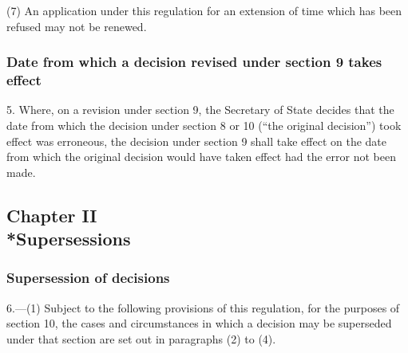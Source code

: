 \documentclass[12pt,a4paper]{article}
\begin{document}
(7) An application under this regulation for an extension of time which has been refused may not be renewed.

\subsubsection[5. Date from which a decision revised under section 9 takes effect]{Date from which a decision revised under section 9 takes effect}

5.  Where, on a revision under section 9, the Secretary of State decides that the date from which the decision under section 8 or 10 (“the original decision”) took effect was erroneous, the decision under section 9 shall take effect on the date from which the original decision would have taken effect had the error not been made.

\subsection[Chapter II --- Supersessions]{Chapter II\\*Supersessions}

\subsubsection[6. Supersession of decisions]{Supersession of decisions}

\renewcommand\parthead{--- Part II Chapter II}

6.—(1) Subject to the following provisions of this regulation, for the purposes of section 10, the cases and circumstances in which a decision may be superseded under that section are set out in paragraphs (2) to (4).
\end{document}
